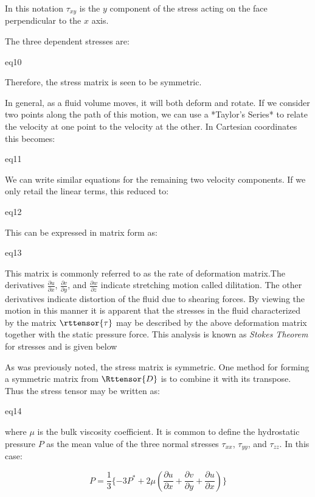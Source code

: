 In this notation $\tau_{xy}$ is the $y$ component of the stress acting on the
face perpendicular to the $x$ axis.

The three dependent stresses are:

{eq10}

Therefore, the stress matrix is seen to be symmetric.

In general, as a fluid volume moves, it will both deform and rotate. If we
consider two points along the path of this motion, we can use a *Taylor's
Series* to relate the velocity at one point to the velocity at the other. In
Cartesian coordinates this becomes:

{eq11}

We can write similar equations for the remaining two velocity components. If we only retail the linear terms, this reduced to:

{eq12}

This can be expressed in matrix form as:

{eq13}

This matrix is commonly referred to as the rate of deformation matrix.The
derivatives $\frac{\partial{u}}{\partial{x}}$,
$\frac{\partial{v}}{\partial{y}}$, and $\frac{\partial{w}}{\partial{z}}$
indicate stretching motion called dilitation. The other derivatives indicate
distortion of the fluid due to shearing forces. By viewing the motion in this
manner it is apparent that the stresses in the fluid characterized by the
matrix $\rttensor{\tau}$ may be described by the above deformation matrix
together with the static pressure force. This analysis is known as {\it Stokes
Theorem} for stresses and is given below

As was previously noted, the stress matrix is symmetric. One method for forming
a symmetric matrix from $\Rttensor{D}$ is to combine it with its transpose. Thus
the stress tensor may be written as:

{eq14}

where $\mu$ is the bulk viscosity coefficient. It is common to define the
hydrostatic pressure $P$ as the mean value of the three normal stresses
$\tau_{xx}$, $\tau_{yy}$, and $\tau_{zz}$. In this case:

\begin{equation}
  P = \frac{1}{3} \{ -3P^* + 2\mu(\frac{\partial{u}}{\partial{x}} + \frac{\partial{v}}{\partial{y}} + \frac{\partial{u}}{\partial{x}} ) \}
\end{equation}

